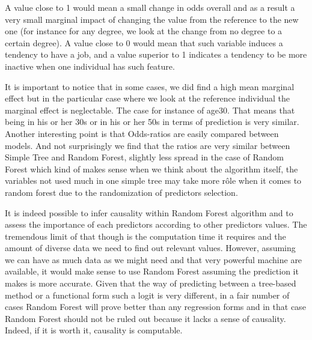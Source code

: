 
A value close to 1 would mean a small change in odds overall and as a result a very small marginal impact of changing the value from the reference to the new one (for instance for any degree, we look at the change from no degree to a certain degree). A value close to 0 would mean that such variable induces a tendency to have a job, and a value superior to 1 indicates a tendency to be more inactive when one individual has such feature.



It is important to notice that in some cases, we did find a high mean marginal effect but in the particular case where we look at the reference individual the marginal effect is neglectable. The case for instance of age30. That means that being in his or her 30s or in his or her 50s in terms of prediction is very similar.
Another interesting point is that Odds-ratios are easily compared between models. And not surprisingly we find that the ratios are very similar between Simple Tree and Random Forest, slightly less spread in the case of Random Forest which kind of makes sense when we think about the algorithm itself, the variables not used much in one simple tree may take more rôle when it comes to random forest due to the randomization of predictors selection.


It is indeed possible to infer causality within Random Forest algorithm and to assess the importance of each predictors according to other predictors values. The tremendous limit of that though is the computation time it requires and the amount of diverse data we need to find out relevant values. However, assuming we can have as much data as we might need and that very powerful machine are available, it would make sense to use Random Forest assuming the prediction it makes is more accurate. Given that the way of predicting between a tree-based method or a functional form such a logit is very different, in a fair number of cases Random Forest will prove better than any regression forms and in that case Random Forest should not be ruled out because it lacks a sense of causality. Indeed, if it is worth it, causality is computable.


